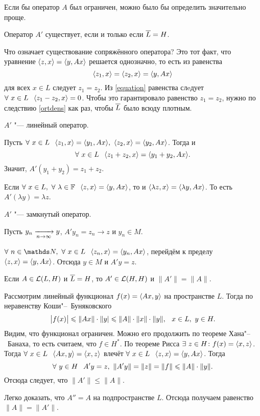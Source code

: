 Если бы оператор $A$ был ограничен, можно было бы определить значительно проще.
\begin{Ut}
  Оператор $A'$ существует, если и только если $\overline{L} = H$.
\end{Ut}
\begin{Proof}
  Что означает существование сопряжённого оператора? Это тот факт, что уравнение $\la z,x\ra \hm= \la y,Ax\ra$ решается однозначно, то есть из равенства 
\begin{equation}\label{equation}
  \langle z_1,x\rangle = \langle z_2,x\rangle = \langle y,Ax\rangle
\end{equation}
для всех $x\in L$ следует $z_1=z_2$. Из \eqref{equation} равенства слeдует $\forall\ x\in L\pau \la z_1-z_2,x\ra=0$. Чтобы это гарантировало равенство $z_1=z_2$, нужно по следствию \ref{ortdens} как раз, чтобы $\overline{L}$ было всюду плотным.
\end{Proof}
\begin{Ut}
$A'$ "--- линейный оператор.
\end{Ut}
\begin{Proof}
Пусть $\forall\ x\in L \hskip .75em plus.1em minus.08em\relax\langle z_1,x\rangle = \langle y_1,Ax\rangle,\ \langle z_2,x\rangle = \langle y_2,Ax\rangle$. Тогда и 
\[
  \forall\ x\in L\pau \la z_1+z_2,x\ra = \la y_1+y_2,Ax\ra.
\]
Значит, $A'(y_1+y_2) = z_1+z_2$.

Если $\forall\ x\in L,\ \forall\ \lambda\in \F\pau \la z,x\ra = \la y,Ax\ra$, то и 
$\langle \lambda z,x\rangle = \langle \lambda y,Ax\rangle$. То есть $A'(\lambda y) = \lambda z$.
\end{Proof}
\begin{Ut}\label{soprzam}
  $A'$ "--- замкнутый оператор.
\end{Ut}
\begin{Proof}
  Пусть $y_n\xrightarrow[n\rightarrow\infty]{} y$, $A'y_n = z_n\to z$ и $y_n\in M$.

$\forall\ n\in\N,\ \forall\ x\in L\pau \la z_n,x\ra = \la y_n,Ax\ra$, перейдём к пределу $\langle z,x\rangle =\langle y,Ax\rangle$. Отсюда $y\in M$ и $A'y=z$.
\end{Proof}
\begin{The}
  Если $A\in\mathcal L(L,H)$ и $\overline{L} = H$, то $A'\in \mathcal L(H,H)$ и $\|A'\|=\|A\|$.
\end{The}
\begin{Proof}
  Рассмотрим линейный функционал $f(x) = \langle Ax,y\rangle$ на пространстве $L$. Тогда по неравенству Коши"--~Буняковского
\[
  \big|f(x)\big|\leqslant \|Ax\|\cdot \|y|\leqslant \|A\|\cdot \|x\|\cdot \|y\|,\hskip .75em plus.1em minus.08em\relax x\in L,\ y\in H.
\]
Видим, что функционал ограничен. Можно его продолжить по теореме Хана"--~Банаха, то есть считаем, что $f\in H^*$. По теореме Рисса $\exists\ z\in H\colon f(x) = \langle x,z\rangle$.
 Тогда $\forall\ x\in L\pau \la Ax,y\ra=\la x,z\ra$ влечёт $\forall\ x\in L\pau \la z,x\ra = \la y,Ax\ra$. Тогда
\[
  \forall\ y\in H\hskip .75em plus.1em minus.08em\relax A'y = z,\ \|A'y\| = \|z\|=\|f\|\leqslant \|A\|\cdot \|y\|.
\]
Отсюда следует, что $\|A'\|\le \|A\|$.

Легко доказать, что $A''=A$ на подпространстве $L$. Отсюда получаем равенство $\|A\|=\|A'\|$.
\end{Proof}

